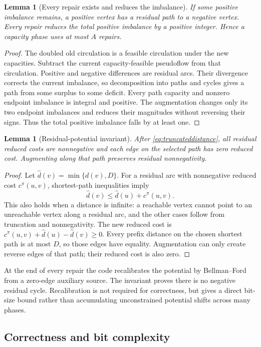 \documentclass[11pt,letterpaper]{article}
\newtheorem{lemma}[theorem]{Lemma}
\theoremstyle{definition}
\theoremstyle{remark}\newtheorem{remark}[theorem]{Remark}
\begin{document}
\begin{lemma}[Every repair exists and reduces the imbalance]
If some positive imbalance remains, a positive vertex has a residual path to
a negative vertex. Every repair reduces the total positive imbalance by a
positive integer. Hence a capacity phase uses at most $A$ repairs.
\end{lemma}
\begin{proof}
The doubled old circulation is a feasible circulation under the new capacities.
Subtract the current capacity-feasible pseudoflow from that circulation.
Positive and negative differences are residual arcs. Their divergence corrects
the current imbalance, so decomposition into paths and cycles gives a path
from some surplus to some deficit. Every path capacity and nonzero endpoint
imbalance is integral and positive. The augmentation changes only its two
endpoint imbalances and reduces their magnitudes without reversing their
signs. Thus the total positive imbalance falls by at least one.
\end{proof}

\begin{lemma}[Residual-potential invariant]
After \eqref{eq:truncateddistance}, all residual reduced costs are nonnegative
and each edge on the selected path has zero reduced cost. Augmenting along
that path preserves residual nonnegativity.
\end{lemma}
\begin{proof}
Let $\widehat d(v)=\min\{d(v),D\}$. For a residual arc with nonnegative reduced
cost $c^\pi(u,v)$, shortest-path inequalities imply
\[
 \widehat d(v)\le\widehat d(u)+c^\pi(u,v).
\]
This also holds when a distance is infinite: a reachable vertex cannot point
to an unreachable vertex along a residual arc, and the other cases follow
from truncation and nonnegativity. The new reduced cost is
$c^\pi(u,v)+\widehat d(u)-\widehat d(v)\ge0$.
Every prefix distance on the chosen shortest path is at most $D$, so those
edges have equality. Augmentation can only create reverse edges of that
path; their reduced cost is also zero.
\end{proof}

At the end of every repair the code recalibrates the potential by
Bellman--Ford from a zero-edge auxiliary source. The invariant proves there
is no negative residual cycle. Recalibration is not required for correctness,
but gives a direct bit-size bound rather than accumulating unconstrained
potential shifts across many phases.

\subsection{Correctness and bit complexity}
\end{document}
